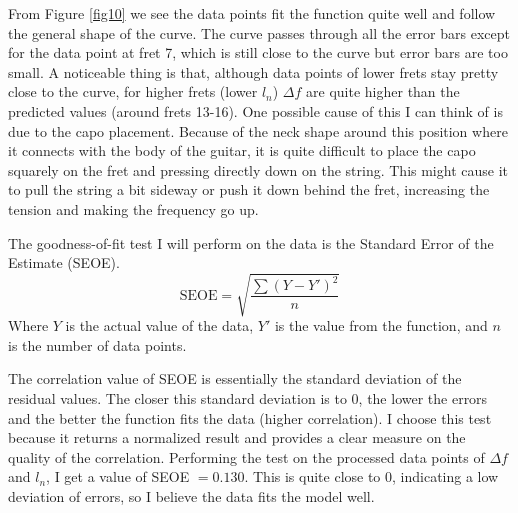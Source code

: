 From Figure \ref{fig10} we see the data points fit the function quite well and follow the general shape of the curve. The curve passes through all the error bars except for the data point at fret 7, which is still close to the curve but error bars are too small. A noticeable thing is that, although data points of lower frets stay pretty close to the curve, for higher frets (lower $l_n$) $\Delta f$ are quite higher than the predicted values (around frets 13-16). One possible cause of this I can think of is due to the capo placement. Because of the neck shape around this position where it connects with the body of the guitar, it is quite difficult to place the capo squarely on the fret and pressing directly down on the string. This might cause it to pull the string a bit sideway or push it down behind the fret, increasing the tension and making the frequency go up. \par
The goodness-of-fit test I will perform on the data is the Standard Error of the Estimate (SEOE). 
\begin{equation*}
    \text{SEOE} = \sqrt{\frac{\sum{(Y-Y')^2}}{n}}
\end{equation*}
Where $Y$ is the actual value of the data, $Y'$ is the value from the function, and $n$ is the number of data points. \cite{lane} \par
The correlation value of SEOE is essentially the standard deviation of the residual values. The closer this standard deviation is to 0, the lower the errors and the better the function fits the data (higher correlation). I choose this test because it returns a normalized result and provides a clear measure on the quality of the correlation. Performing the test on the processed data points of $\Delta f$ and $l_n$, I get a value of SEOE $= 0.130$. This is quite close to 0, indicating a low deviation of errors, so I believe the data fits the model well.